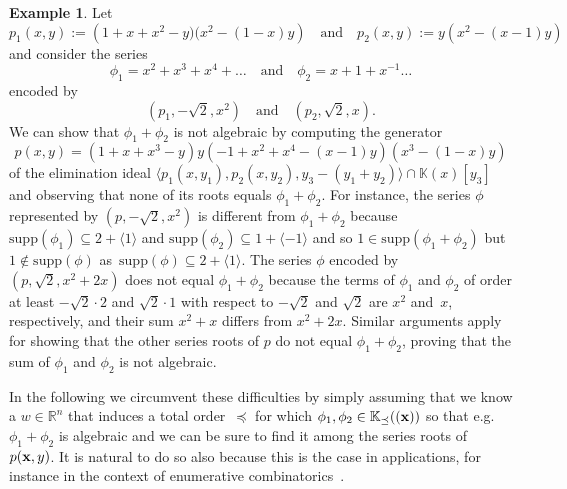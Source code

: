 \documentclass[a4paper,draft]{amsart}
\theoremstyle{definition}
\newtheorem{Example}{Example}
\begin{document}
\begin{Example}
Let 
\begin{equation*}
p_1(x,y) := \left(1+x+x^2 -y)(x^2-(1-x)y\right) \quad \text{and} \quad p_2(x,y) := y \left(x^2-(x-1)y\right)
\end{equation*}
and consider the series 
\begin{equation*}
\phi_1 = x^2 + x^3 + x^4 + \dots \quad \text{and} \quad \phi_2 = x + 1 + x^{-1} \dots 
\end{equation*}
encoded by
\begin{equation*}
(p_1,-\sqrt{2},x^2) \quad \text{and} \quad (p_2,\sqrt{2},x).
\end{equation*}
We can show that $\phi_1 + \phi_2$ is not algebraic by computing the generator
\begin{equation*}
p(x,y) = \left(1 + x + x^3 - y\right) y \left(-1 + x^2 + x^4 - (x-1) y\right) \left(x^3 - (1-x)y\right)
\end{equation*}
of the elimination ideal $\langle p_1(x,y_1) , p_2(x,y_2), y_3 - (y_1+y_2) \rangle\cap\mathbb{K}(x)[y_3]$ and observing that none of its roots equals $\phi_1 + \phi_2$. For instance, the series $\phi$ represented by $(p,-\sqrt{2},x^2)$ is different from $\phi_1 + \phi_2$ because~$\mathrm{supp}(\phi_1)\subseteq 2 + \langle 1 \rangle$ and $\mathrm{supp}(\phi_2)\subseteq 1 + \langle -1 \rangle$ and so $1\in\mathrm{supp}(\phi_1+\phi_2)$ but $1\notin \mathrm{supp}(\phi)$ as~$\mathrm{supp}(\phi)\subseteq 2 + \langle 1 \rangle$.
The series $\phi$ encoded by $(p,\sqrt{2},x^2+2x)$ does not equal $\phi_1 + \phi_2$ because the terms of $\phi_1$ and $\phi_2$ of order at least $-\sqrt{2}\cdot 2$ and $\sqrt{2}\cdot1$ with respect to $-\sqrt{2}$ and $\sqrt{2}$ are $x^2$ and~$x$, respectively, and their sum $x^2+x$ differs from $x^2+2x$. Similar arguments apply for showing that the other series roots of $p$ do not equal $\phi_1 + \phi_2$, proving that the sum of $\phi_1$ and $\phi_2$ is not algebraic.
\end{Example}

In the following we circumvent these difficulties by simply assuming that we know a $w\in\mathbb{R}^n$ that induces a total order~$\preceq$ for which $\phi_1,\phi_2 \in\mathbb{K}_{\preceq}((\bold{x}))$ so that e.g. $\phi_1+\phi_2$ is algebraic and we can be sure to find it among the series roots of~$p(\bold{x},y)$. It is natural to do so also because this is the case in applications, for instance in the context of enumerative combinatorics~\cite[Chapter 6, Section 12]{buchacher2021algorithms}.\\
 
\end{document}
